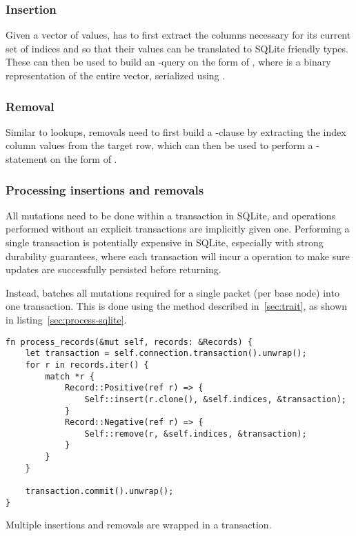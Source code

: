 \subsubsection{Insertion}

Given a vector of values,  has to first extract the
columns necessary for its current set of indices and so that their values can be
translated to SQLite friendly types. These can then be used to build an
-query on the form of , where  is a binary representation of the entire
vector, serialized using .

\subsubsection{Removal}

Similar to lookups, removals need to first build a -clause by
extracting the index column values from the target row, which can then be used
to perform a -statement on the form of .

\subsubsection{Processing insertions and removals}

All mutations need to be done within a transaction in SQLite, and operations
performed without an explicit transactions are implicitly given one. Performing
a single transaction is potentially expensive in SQLite, especially with strong
durability guarantees, where each transaction will incur a 
operation to make sure updates are successfully persisted before returning.

Instead,  batches all mutations required for a single
packet (per base node) into one transaction. This is done using the
 method described in~\ref{sec:trait}, as shown in
listing~\ref{sec:process-sqlite}.

\begin{listing}[H]
  \begin{verbatim}
fn process_records(&mut self, records: &Records) {
    let transaction = self.connection.transaction().unwrap();
    for r in records.iter() {
        match *r {
            Record::Positive(ref r) => {
                Self::insert(r.clone(), &self.indices, &transaction);
            }
            Record::Negative(ref r) => {
                Self::remove(r, &self.indices, &transaction);
            }
        }
    }

    transaction.commit().unwrap();
}
  \end{verbatim}

  \caption{Multiple insertions and removals are wrapped in a transaction.}\label{lst:process-sqlite}
\end{listing}


